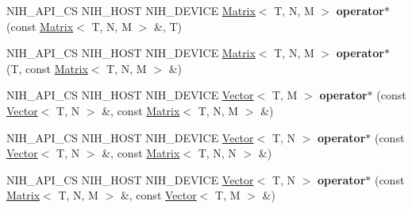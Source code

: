 \begin{DoxyCompactItemize}
\item 
\hypertarget{structnih_1_1_matrix_a9edaf812fed1fb430494129e31049c9e}{
\-N\-I\-H\-\_\-\-A\-P\-I\-\_\-\-C\-S \-N\-I\-H\-\_\-\-H\-O\-S\-T \-N\-I\-H\-\_\-\-D\-E\-V\-I\-C\-E \*
\hyperlink{structnih_1_1_matrix}{\-Matrix}$<$ \-T, \-N, \-M $>$ {\bfseries operator$\ast$} (const \hyperlink{structnih_1_1_matrix}{\-Matrix}$<$ \-T, \-N, \-M $>$ \&, \-T)}
\label{structnih_1_1_matrix_a9edaf812fed1fb430494129e31049c9e}

\item 
\hypertarget{structnih_1_1_matrix_a420f26f0c8944b7baf09ae4e35e532cb}{
\-N\-I\-H\-\_\-\-A\-P\-I\-\_\-\-C\-S \-N\-I\-H\-\_\-\-H\-O\-S\-T \-N\-I\-H\-\_\-\-D\-E\-V\-I\-C\-E \*
\hyperlink{structnih_1_1_matrix}{\-Matrix}$<$ \-T, \-N, \-M $>$ {\bfseries operator$\ast$} (\-T, const \hyperlink{structnih_1_1_matrix}{\-Matrix}$<$ \-T, \-N, \-M $>$ \&)}
\label{structnih_1_1_matrix_a420f26f0c8944b7baf09ae4e35e532cb}

\item 
\hypertarget{structnih_1_1_matrix_a75d351600704ea2bc1ac3bc7e957f23e}{
\-N\-I\-H\-\_\-\-A\-P\-I\-\_\-\-C\-S \-N\-I\-H\-\_\-\-H\-O\-S\-T \-N\-I\-H\-\_\-\-D\-E\-V\-I\-C\-E \*
\hyperlink{structnih_1_1_vector}{\-Vector}$<$ \-T, \-M $>$ {\bfseries operator$\ast$} (const \hyperlink{structnih_1_1_vector}{\-Vector}$<$ \-T, \-N $>$ \&, const \hyperlink{structnih_1_1_matrix}{\-Matrix}$<$ \-T, \-N, \-M $>$ \&)}
\label{structnih_1_1_matrix_a75d351600704ea2bc1ac3bc7e957f23e}

\item 
\hypertarget{structnih_1_1_matrix_a2080215f8cfbc3d8e28117203bd3f64a}{
\-N\-I\-H\-\_\-\-A\-P\-I\-\_\-\-C\-S \-N\-I\-H\-\_\-\-H\-O\-S\-T \-N\-I\-H\-\_\-\-D\-E\-V\-I\-C\-E \*
\hyperlink{structnih_1_1_vector}{\-Vector}$<$ \-T, \-N $>$ {\bfseries operator$\ast$} (const \hyperlink{structnih_1_1_vector}{\-Vector}$<$ \-T, \-N $>$ \&, const \hyperlink{structnih_1_1_matrix}{\-Matrix}$<$ \-T, \-N, \-N $>$ \&)}
\label{structnih_1_1_matrix_a2080215f8cfbc3d8e28117203bd3f64a}

\item 
\hypertarget{structnih_1_1_matrix_a90e49771ff8faf34b8affca8fb924030}{
\-N\-I\-H\-\_\-\-A\-P\-I\-\_\-\-C\-S \-N\-I\-H\-\_\-\-H\-O\-S\-T \-N\-I\-H\-\_\-\-D\-E\-V\-I\-C\-E \*
\hyperlink{structnih_1_1_vector}{\-Vector}$<$ \-T, \-N $>$ {\bfseries operator$\ast$} (const \hyperlink{structnih_1_1_matrix}{\-Matrix}$<$ \-T, \-N, \-M $>$ \&, const \hyperlink{structnih_1_1_vector}{\-Vector}$<$ \-T, \-M $>$ \&)}
\label{structnih_1_1_matrix_a90e49771ff8faf34b8affca8fb924030}


\end{DoxyCompactItemize}
